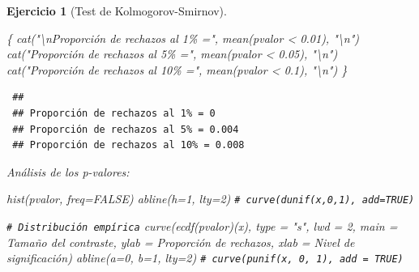 \documentclass[
  10pt,
]{book}
\newenvironment{Shaded}{\begin{snugshade}}{\end{snugshade}}
\newcommand{\AttributeTok}[1]{\textcolor[rgb]{0.77,0.63,0.00}{#1}}
\newcommand{\CommentTok}[1]{\textcolor[rgb]{0.56,0.35,0.01}{\textit{#1}}}
\newcommand{\ConstantTok}[1]{\textcolor[rgb]{0.00,0.00,0.00}{#1}}
\newcommand{\DecValTok}[1]{\textcolor[rgb]{0.00,0.00,0.81}{#1}}
\newcommand{\FloatTok}[1]{\textcolor[rgb]{0.00,0.00,0.81}{#1}}
\newcommand{\FunctionTok}[1]{\textcolor[rgb]{0.00,0.00,0.00}{#1}}
\newcommand{\NormalTok}[1]{#1}
\newcommand{\SpecialCharTok}[1]{\textcolor[rgb]{0.00,0.00,0.00}{#1}}
\newcommand{\StringTok}[1]{\textcolor[rgb]{0.31,0.60,0.02}{#1}}
\theoremstyle{break}
\newtheorem{exercise}{Ejercicio}[chapter]
\theoremstyle{nonumberplain}
\renewcommand{\CommentTok}[1]{\textcolor[rgb]{0.41,0.41,0.41}{\texttt{#1}}}
\begin{document}
\begin{exercise}[Test de Kolmogorov-Smirnov]
\begin{enumerate}
\begin{Shaded}
\begin{Highlighting}[]
\NormalTok{\{}
  \FunctionTok{cat}\NormalTok{(}\StringTok{"}\SpecialCharTok{\textbackslash{}n}\StringTok{Proporción de rechazos al 1\% ="}\NormalTok{, }\FunctionTok{mean}\NormalTok{(pvalor }\SpecialCharTok{\textless{}} \FloatTok{0.01}\NormalTok{), }\StringTok{"}\SpecialCharTok{\textbackslash{}n}\StringTok{"}\NormalTok{)}
  \FunctionTok{cat}\NormalTok{(}\StringTok{"Proporción de rechazos al 5\% ="}\NormalTok{, }\FunctionTok{mean}\NormalTok{(pvalor }\SpecialCharTok{\textless{}} \FloatTok{0.05}\NormalTok{), }\StringTok{"}\SpecialCharTok{\textbackslash{}n}\StringTok{"}\NormalTok{)}
  \FunctionTok{cat}\NormalTok{(}\StringTok{"Proporción de rechazos al 10\% ="}\NormalTok{, }\FunctionTok{mean}\NormalTok{(pvalor }\SpecialCharTok{\textless{}} \FloatTok{0.1}\NormalTok{), }\StringTok{"}\SpecialCharTok{\textbackslash{}n}\StringTok{"}\NormalTok{)}
\NormalTok{\}}
\end{Highlighting}
\end{Shaded}

\begin{verbatim}
 ## 
 ## Proporción de rechazos al 1% = 0 
 ## Proporción de rechazos al 5% = 0.004 
 ## Proporción de rechazos al 10% = 0.008
\end{verbatim}

  Análisis de los p-valores:

\begin{Shaded}
\begin{Highlighting}[]
\FunctionTok{hist}\NormalTok{(pvalor, }\AttributeTok{freq=}\ConstantTok{FALSE}\NormalTok{)}
\FunctionTok{abline}\NormalTok{(}\AttributeTok{h=}\DecValTok{1}\NormalTok{, }\AttributeTok{lty=}\DecValTok{2}\NormalTok{)   }\CommentTok{\# curve(dunif(x,0,1), add=TRUE)}

\CommentTok{\# Distribución empírica}
\FunctionTok{curve}\NormalTok{(}\FunctionTok{ecdf}\NormalTok{(pvalor)(x), }\AttributeTok{type =} \StringTok{"s"}\NormalTok{, }\AttributeTok{lwd =} \DecValTok{2}\NormalTok{, }
      \AttributeTok{main =} \StringTok{\textquotesingle{}Tamaño del contraste\textquotesingle{}}\NormalTok{, }\AttributeTok{ylab =} \StringTok{\textquotesingle{}Proporción de rechazos\textquotesingle{}}\NormalTok{, }
      \AttributeTok{xlab =} \StringTok{\textquotesingle{}Nivel de significación\textquotesingle{}}\NormalTok{)}
\FunctionTok{abline}\NormalTok{(}\AttributeTok{a=}\DecValTok{0}\NormalTok{, }\AttributeTok{b=}\DecValTok{1}\NormalTok{, }\AttributeTok{lty=}\DecValTok{2}\NormalTok{)   }\CommentTok{\# curve(punif(x, 0, 1), add = TRUE) }
\end{Highlighting}
\end{Shaded}


\end{enumerate}
\end{exercise}
\end{document}
